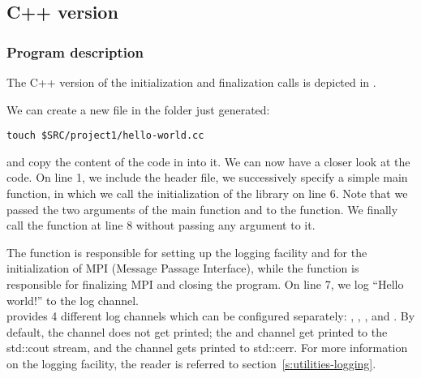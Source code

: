 \subsection{C++ version}
\label{s:atlas-hello-world-C}

\subsubsection*{Program description}
The C++ version of the \Atlas initialization and finalization
calls is depicted in .
%

%
We can create a new file in the folder  just generated:
%
\begin{lstlisting}[style=BashStyle]
touch $SRC/project1/hello-world.cc
\end{lstlisting}
%
and copy the content of the code in  into it.
We can now have a closer look at the code.
On line 1, we include the \Atlas header file, we successively 
specify a simple main function, in which we call the initialization 
of the \Atlas library on line 6.
Note that we passed the two arguments of the main function 
 and  to the  
function.
We finally call the \Atlas {} function 
at line 8 without passing any argument to it.

The function  is responsible for 
setting up the logging facility and for the initialization
of MPI (Message Passage Interface), 
while the function  
is responsible for finalizing MPI and closing the program.
On line 7, we log ``Hello world!'' to the  log
channel.\\
%
\Atlas provides 4 different log channels which can be configured
separately: , , , and
. By default, the  channel does not
get printed; the  and  channel get 
printed to the std::cout stream, and the  channel
gets printed to std::cerr. For more information on the logging
facility, the reader is referred to section~\ref{s:utilities-logging}.


